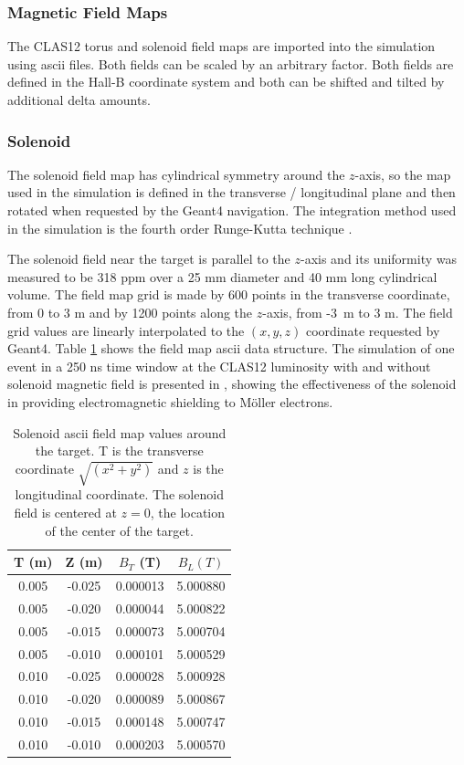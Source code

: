 \subsubsection{Magnetic Field Maps} \label{clas12FieldMaps}

The CLAS12 torus and solenoid field maps are imported into the simulation using ascii files. Both fields can be scaled by an arbitrary factor.
Both fields are defined in the Hall-B coordinate system and both can be shifted and tilted by additional delta amounts.

\subsubsection{Solenoid}
The solenoid field map has cylindrical symmetry around the $z$-axis, so the map used in the simulation is defined
in the transverse / longitudinal plane and then rotated when requested by the Geant4 navigation.
The integration method used in the simulation is the fourth order Runge-Kutta technique \cite{rungeKutta}.

The solenoid field near the target is parallel to the $z$-axis and its uniformity was measured to be 318 ppm over a 25 mm
diameter and 40 mm long cylindrical volume. The field map grid is made by 600 points in the transverse coordinate,
from 0 to 3 m and by 1200 points along the $z$-axis, from \mbox{-3 m} to 3 m.
The field grid values are linearly interpolated to the $(x,y,z)$ coordinate requested by Geant4.
Table \ref{tab:solMap} shows the field map ascii data structure. The simulation of one event in a 250 ns time window at
the CLAS12 luminosity with and without solenoid magnetic field is presented in , showing the effectiveness
of the solenoid in providing electromagnetic shielding to M\"oller electrons.

\begin{table}[h]
	\begin{center}
		\begin{tabular}{| c | c | c | c |}
			T (m)  & Z (m) &  $B_T$ (T) & $ B_L (T)$ \\
			\hline
          0.005  &  -0.025 & 0.000013  & 5.000880 \\
          0.005  &  -0.020 & 0.000044  & 5.000822 \\
          0.005  &  -0.015 & 0.000073  & 5.000704 \\
          0.005  &  -0.010 & 0.000101  & 5.000529 \\
          0.010  &  -0.025 & 0.000028  & 5.000928 \\
          0.010  &  -0.020 & 0.000089  & 5.000867 \\
          0.010  &  -0.015 & 0.000148  & 5.000747 \\
          0.010  &  -0.010 & 0.000203  & 5.000570 \\
		\end{tabular}
	\end{center}
\caption{Solenoid ascii field map values around the target. T is the transverse coordinate $\sqrt{(x^2+y^2)}$ and $z$ is the longitudinal coordinate.
		 The solenoid field is centered at $z=0$, the location of the center of the target.}\label{tab:solMap}
\end{table}

